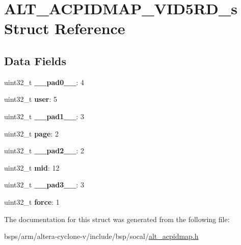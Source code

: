 \hypertarget{structALT__ACPIDMAP__VID5RD__s}{}\section{A\+L\+T\+\_\+\+A\+C\+P\+I\+D\+M\+A\+P\+\_\+\+V\+I\+D5\+R\+D\+\_\+s Struct Reference}
\label{structALT__ACPIDMAP__VID5RD__s}
\subsection*{Data Fields}
\begin{DoxyCompactItemize}
\item 
\mbox{\label{structALT__ACPIDMAP__VID5RD__s_a842ce9d4bedf5958901dde6837a73aff}} 
uint32\+\_\+t {\bfseries \+\_\+\+\_\+pad0\+\_\+\+\_\+}\+: 4
\item 
\mbox{\label{structALT__ACPIDMAP__VID5RD__s_ace3ae428178d13a3dbf7ca2653a889d6}} 
uint32\+\_\+t {\bfseries user}\+: 5
\item 
\mbox{\label{structALT__ACPIDMAP__VID5RD__s_aaa8110ff96a31d22b82359371a976a3c}} 
uint32\+\_\+t {\bfseries \+\_\+\+\_\+pad1\+\_\+\+\_\+}\+: 3
\item 
\mbox{\label{structALT__ACPIDMAP__VID5RD__s_a7a4278fbdfb5ae6d24bdf514a9639d6e}} 
uint32\+\_\+t {\bfseries page}\+: 2
\item 
\mbox{\label{structALT__ACPIDMAP__VID5RD__s_aa8323574e4ddf580ba7f59ca873f7fa2}} 
uint32\+\_\+t {\bfseries \+\_\+\+\_\+pad2\+\_\+\+\_\+}\+: 2
\item 
\mbox{\label{structALT__ACPIDMAP__VID5RD__s_a7e23994ec22940a74c2923fcfe827ebc}} 
uint32\+\_\+t {\bfseries mid}\+: 12
\item 
\mbox{\label{structALT__ACPIDMAP__VID5RD__s_a88d835255e832858f74729a279ffefe4}} 
uint32\+\_\+t {\bfseries \+\_\+\+\_\+pad3\+\_\+\+\_\+}\+: 3
\item 
\mbox{\label{structALT__ACPIDMAP__VID5RD__s_af753aa4721cf6194741be7cca71230da}} 
uint32\+\_\+t {\bfseries force}\+: 1
\end{DoxyCompactItemize}


The documentation for this struct was generated from the following file\+:\begin{DoxyCompactItemize}
\item 
bsps/arm/altera-\/cyclone-\/v/include/bsp/socal/\mbox{\hyperlink{alt__acpidmap_8h}{alt\+\_\+acpidmap.\+h}}\end{DoxyCompactItemize}
